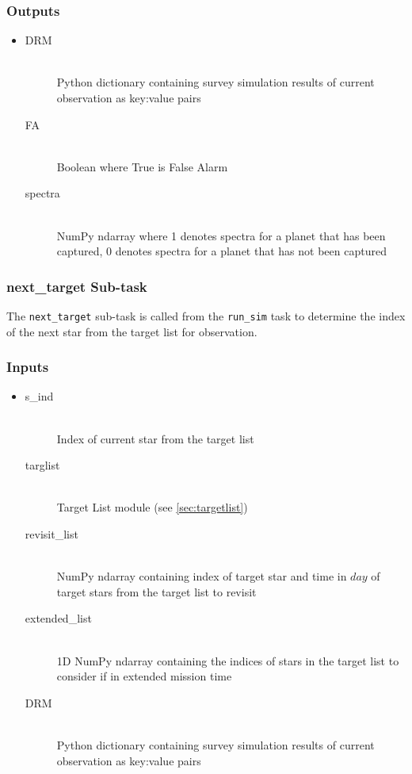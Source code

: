 \documentclass[cleanfoot]{asme2ej}
\begin{document}
\subsubsection*{Outputs}
\begin{itemize}
    \item 
    \begin{description}
        \item[DRM] \hfill \\
        Python dictionary containing survey simulation results of current observation as key:value pairs
        \item[FA] \hfill \\
        Boolean where True is False Alarm
        \item[spectra] \hfill \\
        NumPy ndarray where 1 denotes spectra for a planet that has been captured, 0 denotes spectra for a planet that has not been captured
    \end{description}
\end{itemize}

\subsubsection{next\_target Sub-task} \label{sec:nexttargettask}
The \verb+next_target+ sub-task is called from the \verb+run_sim+ task to determine the index of the next star from the target list for observation.

\subsubsection*{Inputs}
\begin{itemize}
    \item 
    \begin{description}
        \item[s\_ind] \hfill \\
        Index of current star from the target list
        \item[targlist] \hfill \\
        Target List module (see \ref{sec:targetlist})
        \item[revisit\_list] \hfill \\
        NumPy ndarray containing index of target star and time in $ day $ of target stars from the target list to revisit
        \item[extended\_list] \hfill \\
        1D NumPy ndarray containing the indices of stars in the target list to consider if in extended mission time
        \item[DRM] \hfill \\
        Python dictionary containing survey simulation results of current observation as key:value pairs
    \end{description}
\end{itemize}
\end{document}
